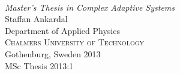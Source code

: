 \begin{titlepage}

\mbox{}
\vfill
\addtolength{\voffset}{2cm}
\begin{flushleft}
	{ \\[0.5cm]
	\emph{\Large Master's Thesis in Complex Adaptive Systems} \\[.8cm]
	
	{\huge Staffan Ankardal}\\[.8cm]
	
	{\Large Department of Applied Physics\\
	\textsc{Chalmers University of Technology} \\
	Gothenburg, Sweden 2013 \\
	MSc Thesis 2013:1\\
	} 
	}
\end{flushleft}

\end{titlepage}
\ClearShipoutPicture

